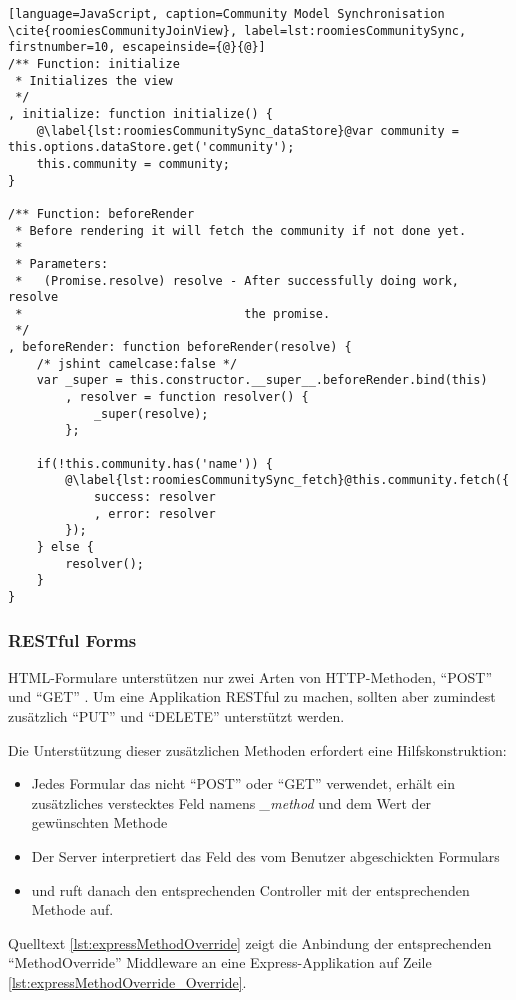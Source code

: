 \begin{lstlisting}[language=JavaScript, caption=Community Model Synchronisation \cite{roomiesCommunityJoinView}, label=lst:roomiesCommunitySync, firstnumber=10, escapeinside={@}{@}]
/** Function: initialize
 * Initializes the view
 */
, initialize: function initialize() {
	@\label{lst:roomiesCommunitySync_dataStore}@var community = this.options.dataStore.get('community');
	this.community = community;
}

/** Function: beforeRender
 * Before rendering it will fetch the community if not done yet.
 *
 * Parameters:
 *   (Promise.resolve) resolve - After successfully doing work, resolve
 *                               the promise.
 */
, beforeRender: function beforeRender(resolve) {
	/* jshint camelcase:false */
	var _super = this.constructor.__super__.beforeRender.bind(this)
		, resolver = function resolver() {
			_super(resolve);
		};

	if(!this.community.has('name')) {
		@\label{lst:roomiesCommunitySync_fetch}@this.community.fetch({
			success: resolver
			, error: resolver
		});
	} else {
		resolver();
	}
}
\end{lstlisting}

\subsubsection*{\gls{RESTful} Forms}
HTML-Formulare unterstützen nur zwei Arten von HTTP-Methoden, ``POST'' und ``GET'' \cite{FormMethodMDN}. Um eine Applikation \gls{RESTful} zu machen, sollten aber zumindest zusätzlich ``PUT'' und ``DELETE'' unterstützt werden.

Die Unterstützung dieser zusätzlichen Methoden erfordert eine Hilfskonstruktion:
\begin{itemize}
	\item Jedes Formular das nicht ``POST'' oder ``GET'' verwendet, erhält ein zusätzliches verstecktes Feld namens \emph{\_method} und dem Wert der gewünschten Methode
	\item Der Server interpretiert das Feld des vom Benutzer abgeschickten Formulars
	\item und ruft danach den entsprechenden Controller mit der entsprechenden Methode auf.
\end{itemize}

\newpage
Quelltext \ref{lst:expressMethodOverride} zeigt die Anbindung der entsprechenden ``MethodOverride'' Middleware \cite{methodOverrideMiddleware} an eine Express-Applikation auf Zeile \ref{lst:expressMethodOverride_Override}.

